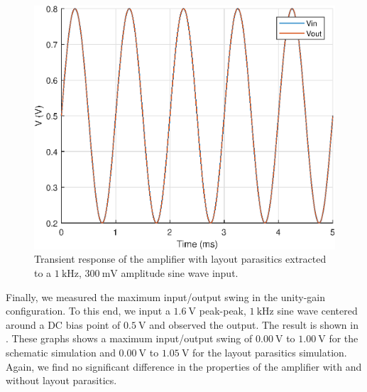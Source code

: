 \documentclass[journal,hidelinks]{IEEEtran}
\begin{document}
\begin{figure}[!htb]
  \centering
  \includegraphics[width=\columnwidth]{figures/layout/tran_3m.eps}
  \caption{Transient response of the amplifier with layout parasitics extracted to a $\SI{1}{\kilo\hertz}$, $\SI{300}{\milli\volt}$ amplitude sine wave input.}
  \label{fig:lay_tran_3m}
\end{figure}

Finally, we measured the maximum input/output swing in the unity-gain configuration. To this end, we input a $\SI{1.6}{\volt}$ peak-peak, $\SI{1}{\kilo\hertz}$ sine wave centered around a DC bias point of $\SI{0.5}{\volt}$ and observed the output. The result is shown in . These graphs shows a maximum input/output swing of $\SI{0.00}{\volt}$ to $\SI{1.00}{\volt}$ for the schematic simulation and $\SI{0.00}{\volt}$ to $\SI{1.05}{\volt}$ for the layout parasitics simulation. Again, we find no significant difference in the properties of the amplifier with and without layout parasitics.
\end{document}
